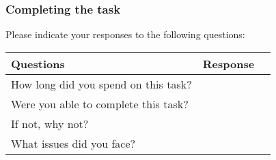\subsubsection{Completing the task}

Please indicate your responses to the following questions:

\begin{table}[h]
\centering
\renewcommand{\arraystretch}{1.5} %
\begin{tabularx}{\textwidth}{|X|X|c|} %
\hline
\textbf{Questions} & \textbf{Response} \\ \hline
How long did you spend on this task? &  \\ \hline
Were you able to complete this task? & \\ \hline
If not, why not? & \\ \hline
What issues did you face? &\\ \hline
\end{tabularx}
\end{table}
